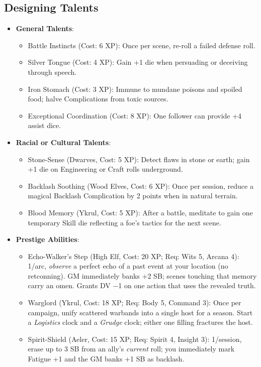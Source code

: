 \subsection*{Designing Talents}

\begin{itemize}
    \item \textbf{General Talents}:
    \begin{itemize}
        \item Battle Instincts (Cost: 6 XP): Once per scene, re-roll a failed defense roll.
        \item Silver Tongue (Cost: 4 XP): Gain +1 die when persuading or deceiving through speech.
        \item Iron Stomach (Cost: 3 XP): Immune to mundane poisons and spoiled food; halve Complications from toxic sources.
        \item Exceptional Coordination (Cost: 8 XP): One follower can provide +4 assist dice.
    \end{itemize}
    \item \textbf{Racial or Cultural Talents}:
    \begin{itemize}
        \item Stone-Sense (Dwarves, Cost: 5 XP): Detect flaws in stone or earth; gain +1 die on Engineering or Craft rolls underground.
        \item Backlash Soothing (Wood Elves, Cost: 6 XP): Once per session, reduce a magical Backlash Complication by 2 points when in natural terrain.
        \item Blood Memory (Ykrul, Cost: 5 XP): After a battle, meditate to gain one temporary Skill die reflecting a foe's tactics for the next scene.
    \end{itemize}
    \item \textbf{Prestige Abilities}:
    \begin{itemize}
        \item Echo-Walker's Step (High Elf, Cost: 20 XP; Req: Wits 5, Arcana 4): 
1/arc, \emph{observe} a perfect echo of a past event at your location (no retconning). 
GM immediately banks +2 SB; scenes touching that memory carry an omen. Grants DV −1 on one action that uses the revealed truth.
        \item Warglord (Ykrul, Cost: 18 XP; Req: Body 5, Command 3): 
Once per campaign, unify scattered warbands into a single host for a season. Start a \emph{Logistics} clock and a \emph{Grudge} clock; either one filling fractures the host.
        \item Spirit-Shield (Aeler, Cost: 15 XP; Req: Spirit 4, Insight 3): 
1/session, erase up to 3 SB from an ally's \emph{current} roll; you immediately mark Fatigue +1 and the GM banks +1 SB as backlash.
    \end{itemize}
\end{itemize}

